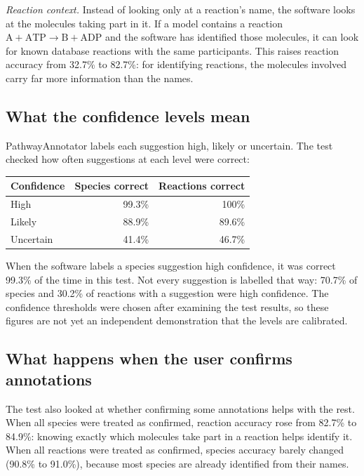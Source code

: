 \documentclass[10pt]{article}
\begin{document}
\emph{Reaction context.} Instead of looking only at a reaction's name, the software looks at the molecules
taking part in it. If a model contains a reaction $\mathrm{A} + \mathrm{ATP} \rightarrow \mathrm{B} +
\mathrm{ADP}$ and the software has identified those molecules, it can look for known database reactions with
the same participants. This raises reaction accuracy from 32.7\% to 82.7\%: for identifying reactions, the
molecules involved carry far more information than the names.

\subsection*{What the confidence levels mean}
PathwayAnnotator labels each suggestion high, likely or uncertain. The test checked how often suggestions at
each level were correct:

\begin{center}\small
\begin{tabular}{lrr}
\toprule
Confidence & Species correct & Reactions correct \\
\midrule
High & 99.3\% & 100\% \\
Likely & 88.9\% & 89.6\% \\
Uncertain & 41.4\% & 46.7\% \\
\bottomrule
\end{tabular}
\end{center}

When the software labels a species suggestion high confidence, it was correct 99.3\% of the time in this test.
Not every suggestion is labelled that way: 70.7\% of species and 30.2\% of reactions with a suggestion were
high confidence. The confidence thresholds were chosen after examining the test results, so these figures are
not yet an independent demonstration that the levels are calibrated.

\subsection*{What happens when the user confirms annotations}
The test also looked at whether confirming some annotations helps with the rest. When all species were treated
as confirmed, reaction accuracy rose from 82.7\% to 84.9\%: knowing exactly which molecules take part in a
reaction helps identify it. When all reactions were treated as confirmed, species accuracy barely changed
(90.8\% to 91.0\%), because most species are already identified from their names.
\end{document}
